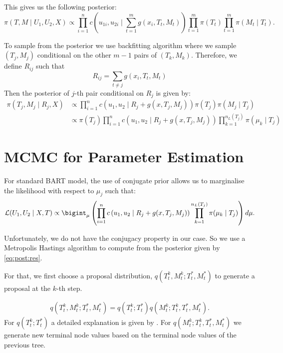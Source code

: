\documentclass{amsart}
\begin{document}
This gives us the following posterior:
\begin{equation}
	\pi(T,M \mid U_1, U_2, X) \propto \prod_{i=1}^{n}c\left(u_{1i},u_{2i}\mid \sum_{t=1}^m g(x_i, T_t, M_t)\right)\prod_{t=1}^{m}\pi(T_t)\prod_{t=1}^{m}\pi(M_t\mid T_t).
\end{equation}

To sample from the posterior we use backfitting algorithm where we sample $(T_j, M_j)$ conditional on the other $m-1$ pairs of $(T_k,M_k)$. Therefore, we define $R_{ij}$ such that
\begin{equation}
	R_{ij} = \sum_{t\not=j}g(x_i, T_t, M_t)
\end{equation}
Then the posterior of $j$-th pair conditional on $R_j$ is given by:
\begin{align}\label{eq:post:res}
	\pi(T_j,M_j \mid R_j, X) &\propto \prod_{i=1}^{n}c\left(u_{1},u_{2}\mid R_j+g(x, T_j, M_j)\right)\pi(T_j)\pi(M_j\mid T_j)\\
	&\propto \pi(T_j)\prod_{i=1}^{n}c\left(u_{1},u_{2}\mid R_j+g(x, T_j, M_j)\right)\prod_{k=1}^{n_L(T_j)}\pi(\mu_k\mid T_j)
\end{align}

\section{MCMC for Parameter Estimation}
For standard BART model, the use of conjugate prior allows us to marginalise the likelihood with respect to $\mu_j$ such that:
\begin{equation}
	\mathcal{L}(U_1,U_2\mid X, T)\propto \bigint_{\mu}\left(\prod_{i=1}^{n}c\left(u_{1},u_{2}\mid R_j+g(x, T_j, M_j)\right)\prod_{k=1}^{n_L(T_j)}\pi(\mu_k\mid T_j)\right)d\mu.
\end{equation}

Unfortunately, we do not have the conjugacy property in our case. So we use a Metropolis Hastings algorithm to compute from the posterior given by \cref{eq:post:res}.

For that, we first choose a proposal distribution, $q\left(T_t^k,M_t^k;T_t^\ast, M_t^\ast\right)$ to generate a proposal at the $k$-th step.

\begin{align}
	q\left(T_t^k,M_t^k;T_t^\ast, M_t^\ast\right) = q\left(T_t^k;T_t^\ast\right) q\left(M_t^k;T_t^k, T_t^\ast, M_t^\ast\right).
\end{align}
For $q\left(T_t^k;T_t^\ast\right)$ a detailed explanation is given by \citet{serafini2024lossbasedpriortreetopologies}. For $q\left(M_t^k;T_t^k, T_t^\ast, M_t^\ast\right)$ we generate new terminal node values based on the terminal node values of the previous tree.
\end{document}
